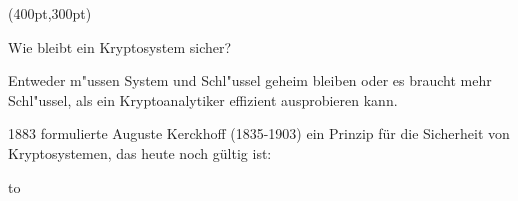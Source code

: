 

\PapierGroesse(400pt,300pt)



\parskip=5pt
\baselineskip=13pt

Wie bleibt ein Kryptosystem sicher?\par
Entweder m"ussen System und Schl"ussel geheim bleiben oder es braucht mehr Schl"ussel, als ein Kryptoanalytiker effizient ausprobieren kann.

1883 formulierte Auguste Kerckhoff (1835-1903) ein Prinzip für die Sicherheit von Kryptosystemen, das heute noch gültig ist:
\par\bigskip

\hbox to


